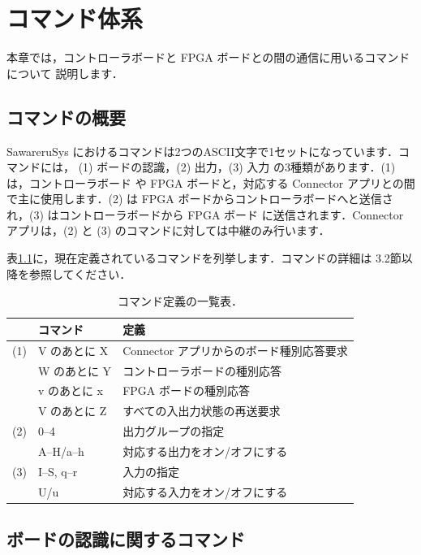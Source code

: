 \chapter{コマンド体系}

本章では，コントローラボードと FPGA ボードとの間の通信に用いるコマンドについて
説明します．

\section{コマンドの概要}

SawareruSys におけるコマンドは2つのASCII文字で1セットになっています．コマンドには，
(1) ボードの認識，(2) 出力，(3) 入力 の3種類があります．(1) は，コントローラボード
や FPGA ボードと，対応する Connector アプリとの間で主に使用します．(2) は FPGA
ボードからコントローラボードへと送信され，(3) はコントローラボードから FPGA ボード
に送信されます．Connector アプリは，(2) と (3) のコマンドに対しては中継のみ行います．

表\ref{table:command}に，現在定義されているコマンドを列挙します．コマンドの詳細は
3.2節以降を参照してください．

\begin{table}[hb]
 \centering
  \caption{コマンド定義の一覧表．}
  \label{table:command}
  \begin{tabular}{l|l|l} \hline
      & コマンド     & 定義 \\ \hline \hline
  (1) & V のあとに X & Connector アプリからのボード種別応答要求 \\
      & W のあとに Y & コントローラボードの種別応答 \\
      & v のあとに x & FPGA ボードの種別応答 \\
      & V のあとに Z & すべての入出力状態の再送要求 \\ \hline
  (2) & 0--4         & 出力グループの指定 \\
      & A--H/a--h    & 対応する出力をオン/オフにする \\ \hline
  (3) & I--S, q--r   & 入力の指定 \\
      & U/u          & 対応する入力をオン/オフにする \\ \hline
 \end{tabular}
\end{table}

\section{ボードの認識に関するコマンド}

